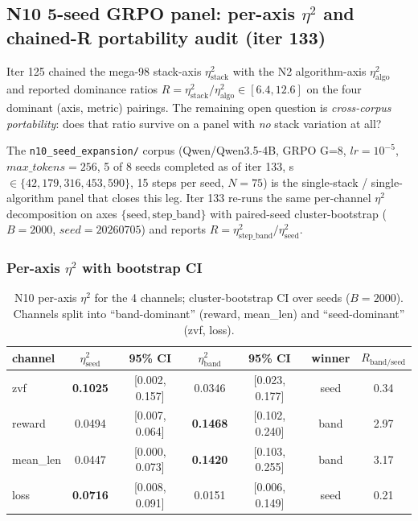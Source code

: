 \subsection{N10 5-seed GRPO panel: per-axis $\eta^2$ and chained-R portability audit (iter 133)}
\label{sec:p5-iter133-n10-eta2}

Iter 125 chained the mega-98 stack-axis $\eta^2_{\mathrm{stack}}$ with the
N2 algorithm-axis $\eta^2_{\mathrm{algo}}$ and reported dominance ratios
$R = \eta^2_{\mathrm{stack}} / \eta^2_{\mathrm{algo}} \in [6.4, 12.6]$ on
the four dominant (axis, metric) pairings. The remaining open question is
\emph{cross-corpus portability}: does that ratio survive on a panel with
\emph{no} stack variation at all?

The \texttt{n10\_seed\_expansion/} corpus (Qwen/Qwen3.5-4B, GRPO G=8,
$lr=10^{-5}$, $max\_tokens=256$, 5 of 8 seeds completed as of iter 133,
s$\in\{42,179,316,453,590\}$, 15 steps per seed, $N=75$) is the
single-stack / single-algorithm panel that closes this leg. Iter 133
re-runs the same per-channel $\eta^2$ decomposition on axes
$\{\mathrm{seed}, \mathrm{step\_band}\}$ with paired-seed cluster-bootstrap
($B=2000$, $seed=20260705$) and reports $R = \eta^2_{\mathrm{step\_band}} / \eta^2_{\mathrm{seed}}$.

\subsubsection{Per-axis $\eta^2$ with bootstrap CI}
\label{sec:p5-iter133-per-axis}
\begin{table}[t]
\centering
\small
\begin{tabular}{lcccccc}
\toprule
channel & $\eta^2_{\mathrm{seed}}$ & 95\% CI & $\eta^2_{\mathrm{band}}$ & 95\% CI & winner & $R_{\mathrm{band/seed}}$\\
\midrule
zvf       & \textbf{0.1025} & [0.002, 0.157] & 0.0346 & [0.023, 0.177] & seed & 0.34\\
reward    & 0.0494 & [0.007, 0.064] & \textbf{0.1468} & [0.102, 0.240] & band & 2.97\\
mean\_len & 0.0447 & [0.000, 0.073] & \textbf{0.1420} & [0.103, 0.255] & band & 3.17\\
loss      & \textbf{0.0716} & [0.008, 0.091] & 0.0151 & [0.006, 0.149] & seed & 0.21\\
\bottomrule
\end{tabular}
\caption{N10 per-axis $\eta^2$ for the 4 channels; cluster-bootstrap CI over
seeds ($B=2000$).  Channels split into ``band-dominant'' (reward, mean\_len)
and ``seed-dominant'' (zvf, loss).}
\label{tab:p5-iter133-eta2}
\end{table}

